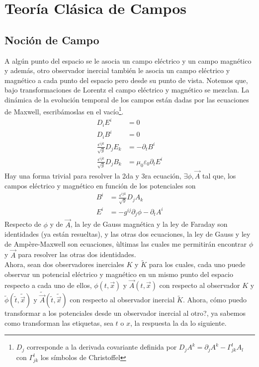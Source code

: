 \documentclass[../main.tex]{subfiles}
\begin{document}
\chapter{Teoría Clásica de Campos}

\section{Noción de Campo}
A algún punto del espacio se le asocia un campo eléctrico y un campo magnético y además, otro observador inercial también le asocia un campo eléctrico y magnético a cada punto del espacio pero desde su punto de vista. Notemos que, bajo transformaciones de Lorentz el campo eléctrico y magnético se mezclan. La dinámica de la evolución temporal de los campos están dadas por las ecuaciones de Maxwell, escribámoslas en el vacío\footnote{$D_j$ corresponde a la derivada covariante definida por $D_jA^k=\partial_jA^k - \Gamma_{jk}^lA_l$  con $\Gamma_{jk}^l$ los símbolos de Christoffel}. 
\begin{align*}
  D_i E^i & = 0 \\
  D_i B^i & = 0 \\
  \frac{\epsilon^{ijk}}{\sqrt{g}}D_jE_k & = -\partial_t B^i \\
  \frac{\epsilon^{ijk}}{\sqrt{g}}D_jB_k & = \mu_0\varepsilon_0 \partial_t E^i
\end{align*}
Hay una forma trivial para resolver la 2da y 3ra ecuación, $\exists \phi, \vec{A}$ tal que, los campos eléctrico y magnético en función de los potenciales son
\begin{align*}
  B^i & = \frac{\epsilon^{ijk}}{\sqrt{g}}D_jA_k \\
  E^i & = -g^{ij}\partial_j\phi - \partial_t A^i
\end{align*}
Respecto de $\phi$ y de $\vec{A}$, la ley de Gauss magnética y la ley de Faraday son identidades (ya están resueltas), y las otras dos ecuaciones, la ley de Gauss y ley de Ampère-Maxwell son ecuaciones, ùltimas las cuales me permitirán encontrar $\phi$ y $\vec{A}$ para resolver las otras dos identidades. \\
Ahora, sean dos observadores inerciales $K$ y $\tilde{K}$ para los cuales, cada uno puede observar un potencial eléctrico y magnético en un mismo punto del espacio respecto a cada uno de ellos, $\phi(t,\vec{x})$ y $\vec{A}(t,\vec{x})$ con respecto al observador $K$ y $\tilde{\phi}(\tilde{t},\tilde{\vec{x}})$ y $\tilde{\vec{A}}(\tilde{t},\tilde{\vec{x}})$ con respecto al observador inercial $\tilde{K}$. Ahora, cómo puedo transformar a los potenciales desde un observador inercial al otro?, ya sabemos como transforman las etiquetas, sea $t$ o $x$, la respuesta la da lo siguiente. 
\end{document}
